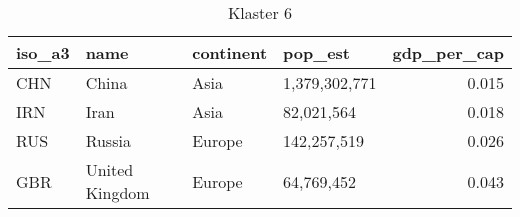 \begin{table}
    \centering
    \caption{Klaster 6}
    \label{tab:cl6}
    \begin{tabular}{llllr}
        \toprule
        iso\_a3 & name           & continent & pop\_est      & gdp\_per\_cap \\
        \midrule
        CHN     & China          & Asia      & 1,379,302,771 & 0.015         \\
        IRN     & Iran           & Asia      & 82,021,564    & 0.018         \\
        RUS     & Russia         & Europe    & 142,257,519   & 0.026         \\
        GBR     & United Kingdom & Europe    & 64,769,452    & 0.043         \\
        \bottomrule
    \end{tabular}
\end{table}
